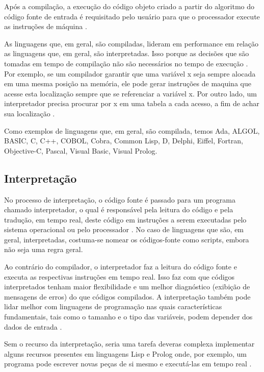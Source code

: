 Após a compilação, a execução do código objeto criado a partir do algoritmo do
 código fonte de entrada é requisitado pelo usuário para que o processador 
execute as instruções de máquina \cite{ref6}.

As linguagens que, em geral, são compiladas, lideram em performance em relação
 as linguagens que, em geral, são interpretadas. Isso porque as decisões que são
 tomadas em tempo de compilação não são necessários no tempo de execução \cite{ref7}.
Por exemplo, se um compilador garantir que uma variável x seja sempre alocada 
em uma  mesma posição na memória,  ele pode gerar instruções de maquina que 
acesse esta localização sempre que se referenciar a variável x. 
Por outro lado, um interpretador precisa procurar  por x em uma tabela a cada 
acesso, a fim de achar sua localização \cite{ref8}.

Como exemplos de linguagens que, em geral, são compilada, temos Ada, ALGOL, 
BASIC, C, C++, COBOL, Cobra, Common Lisp, D, Delphi, Eiffel, Fortran, 
Objective-C, Pascal, Visual Basic, Visual Prolog.

\subsection{Interpretação}

No processo de interpretação, o código fonte é passado para um programa chamado
 interpretador, o qual é responsável pela leitura do código e pela tradução, 
em tempo real, deste código em instruções a serem executadas pelo sistema 
operacional ou  pelo processador \cite{ref8}. No caso de linguagens que são, em geral, 
interpretadas, costuma-se nomear os códigos-fonte como scripts, embora não seja 
uma regra geral.

Ao contrário do compilador, o interpretador faz a leitura do código fonte e 
executa  as respectivas instruções em tempo real. Isso faz com que  códigos 
interpretados tenham maior flexibilidade e um melhor diagnóstico (exibição de 
mensagens de erros) do que  códigos compilados. A interpretação também pode lidar 
melhor com linguagens de programação nas quais características fundamentais, 
tais como  o tamanho e  o tipo das variáveis, podem depender dos dados de 
entrada \cite{ref6}.

Sem  o recurso da interpretação, seria uma tarefa deveras complexa implementar 
alguns recursos  presentes em linguagens Lisp e Prolog onde, por exemplo, 
um programa pode escrever novas peças de si mesmo e executá-las em tempo real
 \cite{ref6}.

